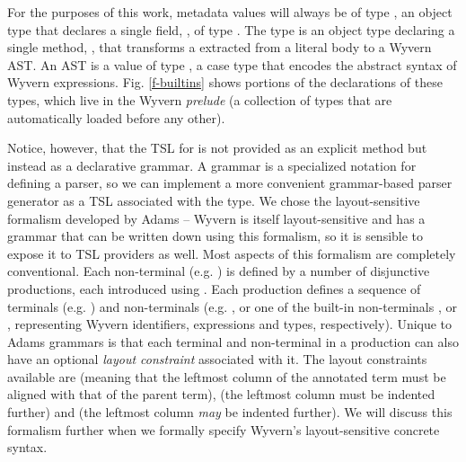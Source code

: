 For the purposes of this work, metadata values will always be of type , an object type that declares a single field, , of type . The  type is an object type declaring a single method, , that transforms a  extracted from a literal body to a Wyvern AST. An AST is a value of type , a case type that encodes the abstract syntax of Wyvern expressions. Fig. \ref{f-builtins} shows portions of the declarations of these types, which live in the Wyvern \emph{prelude} (a collection of types that are automatically loaded before any other).

Notice, however, that the TSL for  is not provided as an explicit  method but instead as a declarative grammar. A grammar is a specialized notation for defining a parser, so we can implement a more convenient grammar-based parser generator  as a TSL associated with the  type. We chose the  layout-sensitive formalism developed by Adams \cite{Adams:2013:PPI:2429069.2429129} -- Wyvern is itself layout-sensitive and has a grammar that can be written down using this formalism, so it is sensible to expose it to TSL providers as well. Most aspects of this formalism are completely conventional. 
Each non-terminal (e.g. ) is defined by a number of disjunctive productions, each introduced using \li{->}. Each production defines a sequence of terminals (e.g. ) and non-terminals (e.g. , or one of the built-in non-terminals ,  or , representing Wyvern identifiers, expressions and types, respectively). Unique to Adams grammars is that each terminal and non-terminal in a production can also have an optional \emph{layout constraint} associated with it. The layout constraints available are \li{=} (meaning that the leftmost column of the annotated term must be aligned with that of the parent term), \li{>} (the leftmost column must be indented further) and \li{>=} (the leftmost column \emph{may} be indented further). We will discuss this formalism further when we formally specify Wyvern's layout-sensitive concrete syntax.

